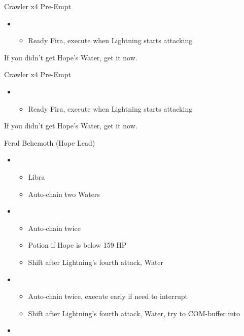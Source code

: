 \begin{paracol}{2}
	\begin{battle}{Crawler x4 Pre-Empt}
		\begin{itemize}
			\item \first
			      \begin{itemize}
				      \item Ready Fira, execute when Lightning starts attacking
			      \end{itemize}
		\end{itemize}
	\end{battle}
	If you didn't get Hope's Water, get it now.
	\switchcolumn
	\begin{battle}{Crawler x4 Pre-Empt}
		\begin{itemize}
			\item \first
			      \begin{itemize}
				      \item Ready Fira, execute when Lightning starts attacking
			      \end{itemize}
		\end{itemize}
	\end{battle}
	If you didn't get Hope's Water, get it now.
	\switchcolumn*
	\begin{battle}{Feral Behemoth (Hope Lead)}
		\begin{itemize}
			\item \first
			      \begin{itemize}
				      \item Libra
				      \item Auto-chain two Waters
			      \end{itemize}
			\item \fourth
			      \begin{itemize}
				      \item Auto-chain twice
				      \item Potion if Hope is below 159 HP
				      \item Shift after Lightning's fourth attack, Water
			      \end{itemize}
			\item \fifth
			      \begin{itemize}
				      \item Auto-chain twice, execute early if need to interrupt
				      \item Shift after Lightning's fourth attack, Water, try to COM-buffer into
			      \end{itemize}
			\item \sixth

\end{itemize}
\end{battle}
\end{paracol}

